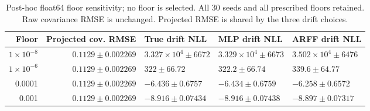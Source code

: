 \begin{table}[ht]\centering\small\caption{Post-hoc float64 floor sensitivity; no floor is selected. All 30 seeds and all prescribed floors retained. Raw covariance RMSE is unchanged. Projected RMSE is shared by the three drift choices.}\begin{tabular}{rrlll}\toprule Floor & Projected cov. RMSE & True drift NLL & MLP drift NLL & ARFF drift NLL\\\midrule
$1\times10^{-8}$ & $0.1129\pm 0.002269$ & $3.327\times10^{4}\pm 6672$ & $3.329\times10^{4}\pm 6673$ & $3.502\times10^{4}\pm 6476$\\
$1\times10^{-6}$ & $0.1129\pm 0.002269$ & $322\pm 66.72$ & $322.2\pm 66.74$ & $339.6\pm 64.77$\\
0.0001 & $0.1129\pm 0.002269$ & $-6.436\pm 0.6757$ & $-6.434\pm 0.6759$ & $-6.258\pm 0.6572$\\
0.001 & $0.1129\pm 0.002269$ & $-8.916\pm 0.07434$ & $-8.916\pm 0.07438$ & $-8.897\pm 0.07317$\\
\bottomrule\end{tabular}\end{table}

